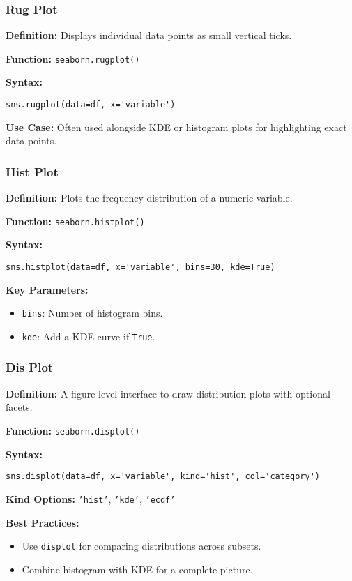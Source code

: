 \subsubsection{Rug Plot}
\textbf{Definition:} Displays individual data points as small vertical ticks.

\textbf{Function:} \texttt{seaborn.rugplot()}

\textbf{Syntax:}
\begin{verbatim}
sns.rugplot(data=df, x='variable')
\end{verbatim}

\textbf{Use Case:} Often used alongside KDE or histogram plots for highlighting exact data points.

\subsubsection{Hist Plot}
\textbf{Definition:} Plots the frequency distribution of a numeric variable.

\textbf{Function:} \texttt{seaborn.histplot()}

\textbf{Syntax:}
\begin{verbatim}
sns.histplot(data=df, x='variable', bins=30, kde=True)
\end{verbatim}

\textbf{Key Parameters:}
\begin{itemize}
    \item \texttt{bins}: Number of histogram bins.
    \item \texttt{kde}: Add a KDE curve if \texttt{True}.
\end{itemize}

\subsubsection{Dis Plot}
\textbf{Definition:} A figure-level interface to draw distribution plots with optional facets.

\textbf{Function:} \texttt{seaborn.displot()}

\textbf{Syntax:}
\begin{verbatim}
sns.displot(data=df, x='variable', kind='hist', col='category')
\end{verbatim}

\textbf{Kind Options:} \texttt{'hist'}, \texttt{'kde'}, \texttt{'ecdf'}

\textbf{Best Practices:}
\begin{itemize}
    \item Use \texttt{displot} for comparing distributions across subsets.
    \item Combine histogram with KDE for a complete picture.
\end{itemize}

